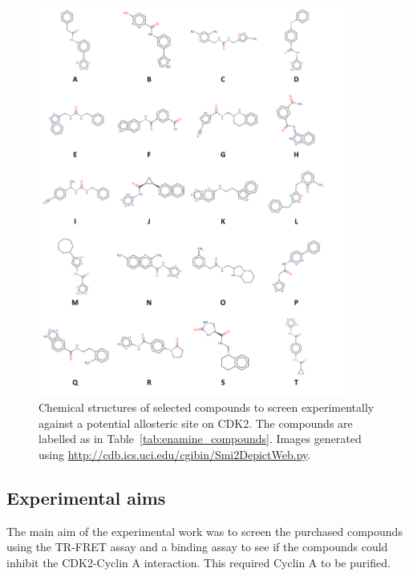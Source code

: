 \begin{figure}
\centering

\includegraphics[width=0.9\textwidth]{figures/compound_structures/compound_structures}

\caption[Chemical structures of selected compounds to screen experimentally against a potential allosteric site on CDK2]
{Chemical structures of selected compounds to screen experimentally against a potential allosteric site on CDK2.
The compounds are labelled as in Table~\ref{tab:enamine_compounds}.
Images generated using \url{http://cdb.ics.uci.edu/cgibin/Smi2DepictWeb.py}.}

\label{fig:compound_structures}
\end{figure}


\subsection{Experimental aims}

The main aim of the experimental work was to screen the purchased compounds using the TR-FRET assay and a binding assay to see if the compounds could inhibit the CDK2-Cyclin A interaction.
This required Cyclin A to be purified.


